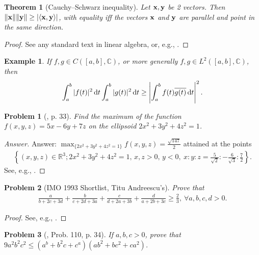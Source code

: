 \documentclass[oneside]{book}
\numberwithin{equation}{section}
\newtheorem{theorem}{Theorem}[section]
\newtheorem{example}{Example}[section]
\newtheorem{problem}{Problem}[section]
\begin{document}
\begin{theorem}[Cauchy--Schwarz inequality]
	Let ${\bf x},{\bf y}$ be 2 vectors. Then $\|{\bf x}\|\|{\bf y}\|\ge|\langle{\bf x},{\bf y}\rangle|$, with equality iff the vectors ${\bf x}$ and ${\bf y}$ are parallel and point in the same direction.
\end{theorem}

\begin{proof}[Proof]
	See any standard text in linear algebra, or, e.g., \cite[p. 33]{Gelca_Andreescu2017}.
\end{proof}

\begin{example}
	If $f,g\in C([a,b],\mathbb{C})$, or more generally $f,g\in L^2([a,b],\mathbb{C})$, then
	\begin{align*}
		\int_a^b |f(t)|^2\,{\rm d}t\int_a^b |g(t)|^2\,{\rm d}t\ge\left|\int_a^b f(t)\overline{g(t)}\,{\rm d}t\right|^2.
	\end{align*}
\end{example}

\begin{problem}[\cite{Gelca_Andreescu2017}, p. 33]
	Find the maximum of the function $f(x,y,z) = 5x - 6y + 7z$ on the ellipsoid $2x^2 + 3y^2 + 4z^2 = 1$.
\end{problem}

\begin{proof}[Answer]
	Answer: $\max_{\{2x^2 + 3y^2 + 4z^2 = 1\}} f(x,y,z) = \frac{\sqrt{147}}{2}$ attained at the points
	\begin{align*}
		\left\{(x,y,z)\in\mathbb{R}^3;2x^2 + 3y^2 + 4z^2 = 1,\,x,z > 0,\, y < 0,\ x:y:z = \frac{5}{\sqrt{2}}:-\frac{6}{\sqrt{3}}:\frac{7}{2}\right\}.
	\end{align*}
	See, e.g., \cite[p. 33]{Gelca_Andreescu2017}.
\end{proof}

\begin{problem}[IMO 1993 Shortlist, Titu Andreescu's]
	Prove that
	\begin{align*}
		\frac{a}{b + 2c + 3d} + \frac{b}{c + 2d + 3a} + \frac{c}{d + 2a + 3b} + \frac{d}{a + 2b + 3c}\ge\frac{2}{3},\ \forall a,b,c,d > 0.
	\end{align*}
\end{problem}

\begin{proof}[Proof]
	See, e.g., \cite[p. 34]{Gelca_Andreescu2017}.
\end{proof}

\begin{problem}[\cite{Gelca_Andreescu2017}, Prob. 110, p. 34]
	If $a,b,c > 0$, prove that $9a^2b^2c^2\le(a^b + b^2c + c^a)(ab^2 + bc^2 + ca^2)$.
\end{problem}
\end{document}
